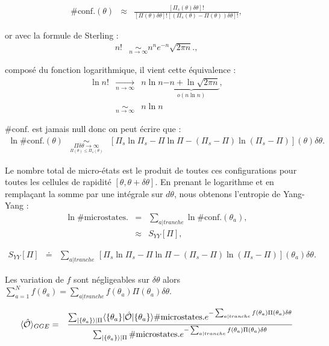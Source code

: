 	\begin{eqnarray}
		\# \mbox{conf.}(\theta) & \approx  & \frac{[ \Pi_s ( \theta ) \delta \theta ] ! }{ [ \Pi ( \theta ) \delta \theta ] ! [( \Pi_s ( \theta ) - \Pi ( \theta ) )  \delta \theta ] ! } , 	
	\end{eqnarray}
	
	or avec la formule de Sterling :  
	\begin{eqnarray}
		n! & \underset{n \to \infty}{\sim} n^n e^{-n} \sqrt{2\pi n}.,
	\end{eqnarray}
	
	composé du fonction logarithmique, il vient cette équivalence : 
	\begin{eqnarray}
		\ln n! & \underset{n \to \infty}{\rightarrow} & n \ln n \underbrace{- n + \ln \sqrt{2 \pi n }}_{o \left ( n \ln n \right ) } ,\\
		&  \underset{n \to \infty}{\sim} & n \ln n  
	\end{eqnarray}
	
	$\# \mbox{conf.}$ est jamais null donc on peut écrire que : 
\begin{eqnarray}
    \ln \# \mbox{conf.}(\theta) & \underset{\underset{\Pi (\theta )\leq  \Pi_s (\theta )}{\Pi \delta \theta  \to \infty}}{\sim}   & [ \Pi_s\ln \Pi_s - \Pi \ln \Pi - ( \Pi_s - \Pi ) \ln ( \Pi_s - \Pi) ] (\theta )\delta \theta .
\end{eqnarray}

Le nombre total de micro-états est le produit de toutes ces configurations pour toutes les cellules de rapidité $[\theta, \theta + \delta \theta]$. En prenant le logarithme et en remplaçant la somme par une intégrale sur $d \theta$, nous obtenons l'entropie de Yang-Yang :
\begin{eqnarray}
    \ln \# \mbox{microstates.} & = & \sum_{a\vert tranche} \ln \# \mbox{conf.}(\theta_a), \\
    & \approx &   S_{YY} [ \Pi ] , 	
\end{eqnarray}

\begin{eqnarray}
    S_{YY}[\Pi] & \doteq & \sum_{a\vert tranche} \, [ \Pi_s\ln \Pi_s - \Pi \ln \Pi - ( \Pi_s - \Pi ) \ln ( \Pi_s - \Pi ) ] (\theta_a) \delta \theta .
\end{eqnarray}
	
	Les variation de $f$ sont négligeables sur $\delta \theta $ alors  $\sum_{a = 1}^N  f(\theta_a) = \sum_{a \vert tranche } f(\theta_a) \Pi( \theta_a)\delta \theta$.
	
	
	\begin{eqnarray}
		\langle \hat{\mathbf{\mathcal{O}}} \rangle_{GGE} & =  & \frac{  \sum_{\vert \{\theta_a \}\rangle \vert \Pi } \langle  \{ \theta_a\}  \vert   \hat{\mathbf{\mathcal{O}}} \vert \{ \theta_a\} \rangle \# \mbox{microstates.} e^{- \sum_{a \vert tranche} f(\theta_a) \Pi ( \theta_a )  \delta \theta}    }{ \sum_{\vert \{\theta_a \}\rangle \vert \Pi }  \# \mbox{microstates.}e^{- \sum_{a \vert tranche }  f(\theta_a) \Pi ( \theta_a ) \delta \theta } }
	\end{eqnarray}
	
